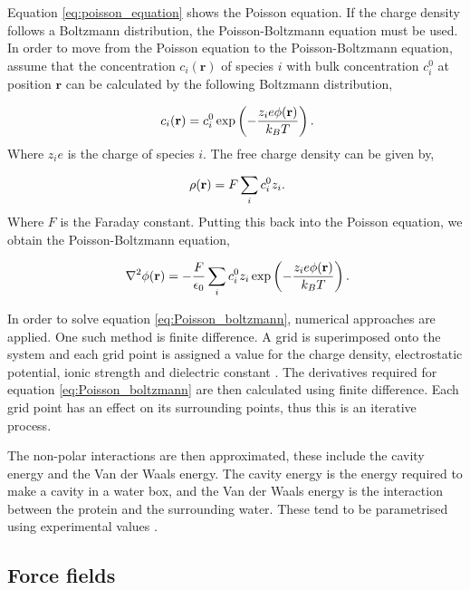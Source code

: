 Equation \ref{eq:poisson_equation} shows the Poisson equation.  If the charge density follows a Boltzmann distribution, the Poisson-Boltzmann equation must be used\cite{Simulate_Phys_world}.  In order to move from the Poisson equation to the Poisson-Boltzmann equation, assume that the concentration $c_i(\mathbf{r})$ of species $i$ with bulk concentration $c_i^0$ at position $\mathbf{r}$ can be calculated by the following Boltzmann distribution,

\begin{equation}
\ c_i (\mathbf{r}) = c_i^0 \exp \left( - \frac{z_ie \phi(\mathbf{r})}{k_BT}  \right) \\.
\end{equation}
%
Where $z_ie$ is the charge of species $i$.  The free charge density can be given by,

\begin{equation}
\ \rho(\mathbf{r}) = F \sum_i c_i^0 z_i \\.
\end{equation}
%
Where $F$ is the Faraday constant.  Putting this back into the Poisson equation, we obtain the Poisson-Boltzmann equation,

\begin{equation} \label{eq:Poisson_boltzmann}
\ \nabla^2 \phi(\mathbf{r}) = - \frac{F}{\epsilon_0} \sum_i c_i^0 z_i \exp \left( - \frac{z_ie \phi(\mathbf{r})}{k_BT}  \right) \\.
\end{equation}

In order to solve equation \ref{eq:Poisson_boltzmann}, numerical approaches are applied.  One such method is finite difference.  A grid is superimposed onto the system and each grid point is assigned a value for the charge density, electrostatic potential, ionic strength and dielectric constant \cite{Leach_chem}.  The derivatives required for equation \ref{eq:Poisson_boltzmann} are then calculated using finite difference.  Each grid point has an effect on its surrounding points, thus this is an iterative process.

The non-polar interactions are then approximated, these include the cavity energy and the Van der Waals energy.  The cavity energy is the energy required to make a cavity in a water box, and the Van der Waals energy is the interaction between the protein and the surrounding water.  These tend to be parametrised using experimental values \cite{Leach_chem}.


\subsection{Force fields}

